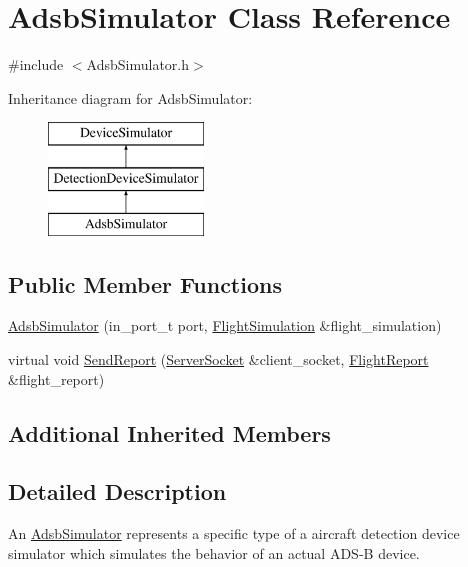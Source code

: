 \hypertarget{class_adsb_simulator}{}\section{Adsb\+Simulator Class Reference}
\label{class_adsb_simulator}


{\ttfamily \#include $<$Adsb\+Simulator.\+h$>$}

Inheritance diagram for Adsb\+Simulator\+:\begin{figure}[H]
\begin{center}
\leavevmode
\includegraphics[height=3.000000cm]{class_adsb_simulator}
\end{center}
\end{figure}
\subsection*{Public Member Functions}
\begin{DoxyCompactItemize}
\item 
\hyperlink{class_adsb_simulator_a6a9b87087238c685b862921ad5ad0cbc}{Adsb\+Simulator} (in\+\_\+port\+\_\+t port, \hyperlink{class_flight_simulation}{Flight\+Simulation} \&flight\+\_\+simulation)
\item 
virtual void \hyperlink{class_adsb_simulator_a560b7009e705465ef5c2061f89060728}{Send\+Report} (\hyperlink{class_server_socket}{Server\+Socket} \&client\+\_\+socket, \hyperlink{class_flight_report}{Flight\+Report} \&flight\+\_\+report)
\end{DoxyCompactItemize}
\subsection*{Additional Inherited Members}


\subsection{Detailed Description}
An \hyperlink{class_adsb_simulator}{Adsb\+Simulator} represents a specific type of a aircraft detection device simulator which simulates the behavior of an actual A\+D\+S-\/\+B device. 

